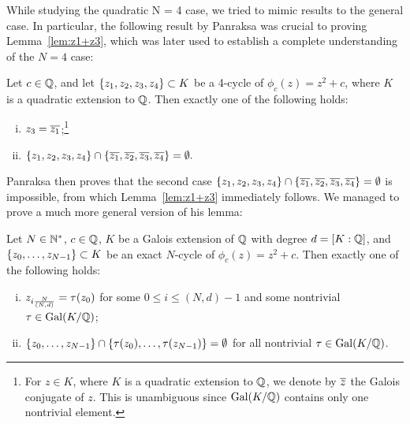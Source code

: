 While studying the quadratic N = 4 case, we tried to mimic results to
the general case. In particular, the following result by Panraksa was
crucial to proving Lemma~\ref{lem:z1+z3}, which was later used to
establish a complete understanding of the $N = 4$ case:

\begin{lemma} 
  Let $c \in \mathbb{Q}$, and let $\left\{z_1, z_2, z_3, z_4\right\} \subset K$ be a
  4-cycle of $\phi_c(z) = z^2 + c$, where $K$ is a quadratic extension
  to $\mathbb{Q}$. Then exactly one of the following holds:
  \begin{enumerate}[(i)]
  \item $z_3 = \overline{z_1}$;\footnote{%
      For $z \in K$, where $K$ is a quadratic extension to $\mathbb{Q}$, we
      denote by $\overline{z}$ the Galois conjugate of $z$. This is
      unambiguous since $\mathrm{Gal}(K/\mathbb{Q})$ contains only one nontrivial
      element.}

  \item $\{z_1, z_2, z_3, z_4\} \cap \{\overline{z_1}, \overline{z_2}, \overline{z_3},
    \overline{z_4}\} =\emptyset.$
  \end{enumerate}
\end{lemma}

Panraksa then proves that the second case $\{z_1, z_2, z_3, z_4\} \cap
\{\overline{z_1}, \overline{z_2}, \overline{z_3}, \overline{z_4}\} = \emptyset$ is impossible, from
which Lemma~\ref{lem:z1+z3} immediately follows. We managed to prove a
much more general version of his lemma:


\begin{theorem}
  Let $N \in \mathbb{N}^*$, $c \in \mathbb{Q}$, $K$ be a Galois extension of $\mathbb{Q}$ with
  degree $d = [K : \mathbb{Q}]$, and $\left\{z_0, \dots, z_{N-1}\right\} \subset K$ be
  an exact $N$-cycle of $\phi_c(z) = z^2 + c$. Then exactly one of the
  following holds:
  \begin{enumerate}[(i)]
  \item $z_{i\frac{N}{(N, d)}} = \tau(z_0)$ for some $0 \le i \le (N, d)-1$ and some
    nontrivial $\tau \in \mathrm{Gal}(K/\mathbb{Q})$;

  \item $\left\{z_0, \dots, z_{N-1}\right\} \cap \left\{\tau(z_0), \dots,
      \tau(z_{N-1})\right\} = \emptyset$ for all nontrivial $\tau \in \mathrm{Gal}(K/\mathbb{Q})$.
  \end{enumerate}
\end{theorem}

